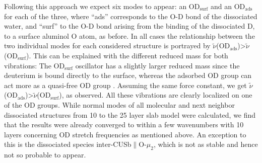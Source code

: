 \documentclass[11pt,DIV=13,BCOR=5mm,a4paper,headinclude]{scrbook}
\begin{document}
 Following this approach we expect six modes to appear: an OD$_\textrm{surf}$ and an OD$_\textrm{ads}$ for each of the three, where ``ads'' corresponds to the O-D bond of the dissociated water, and ``surf'' to the O-D bond arising from the binding of the dissociated D, to a surface aluminol O atom, as before.
In all cases the relationship between the two individual modes for each considered structure is portrayed by $\tilde{\nu}$(OD$_\textrm{ads}$)>$\tilde{\nu}$(OD$_\textrm{surf}$).
This can be explained with the different reduced mass for both vibrations: The OD$_\textrm{surf}$ oscillator has a slightly larger reduced mass since the deuterium is bound directly to the surface, whereas the adsorbed OD group can act more as a quasi-free OD group \cite{Wirth2014}.
Assuming the same force constant, we get $\tilde{\nu}$(OD$_\textrm{ads}$)>$\tilde{\nu}$(OD$_\textrm{surf}$), as observed.
All these vibrations are clearly localized on one of the OD groups. %
While normal modes of all molecular and next neighbor dissociated structures from 10 to the 25 layer slab model were calculated, we find that the results were already converged to within a few wavenumbers with 10 layers concerning OD stretch frequencies as mentioned above. %
An exception to this is the dissociated species inter-CUSb$\parallel$O-$\mu_2$, which is not as stable and hence not so probable to appear.
\\
\\
\end{document}
